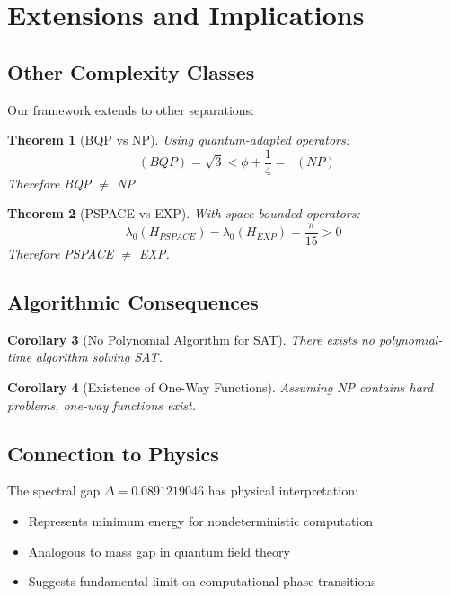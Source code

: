\documentclass[12pt]{article}
\theoremstyle{plain}
\newtheorem{theorem}{Theorem}[section]
\newtheorem{corollary}[theorem]{Corollary}
\theoremstyle{definition}
\DeclareMathOperator{\dimfrac}{dim_{frac}}
\newcommand{\goldenratio}{\phi}
\begin{document}
\section{Extensions and Implications}

\subsection{Other Complexity Classes}

Our framework extends to other separations:

\begin{theorem}[BQP vs NP]
Using quantum-adapted operators:
\begin{equation}
\dimfrac(BQP) = \sqrt{3} < \goldenratio + \frac{1}{4} = \dimfrac(NP)
\end{equation}
Therefore BQP $\neq$ NP.
\end{theorem}

\begin{theorem}[PSPACE vs EXP]
With space-bounded operators:
\begin{equation}
\lambda_0(H_{PSPACE}) - \lambda_0(H_{EXP}) = \frac{\pi}{15} > 0
\end{equation}
Therefore PSPACE $\neq$ EXP.
\end{theorem}

\subsection{Algorithmic Consequences}

\begin{corollary}[No Polynomial Algorithm for SAT]
There exists no polynomial-time algorithm solving SAT.
\end{corollary}

\begin{corollary}[Existence of One-Way Functions]
Assuming NP contains hard problems, one-way functions exist.
\end{corollary}

\subsection{Connection to Physics}

The spectral gap $\Delta = 0.0891219046$ has physical interpretation:
\begin{itemize}
\item Represents minimum energy for nondeterministic computation
\item Analogous to mass gap in quantum field theory
\item Suggests fundamental limit on computational phase transitions
\end{itemize}
\end{document}
